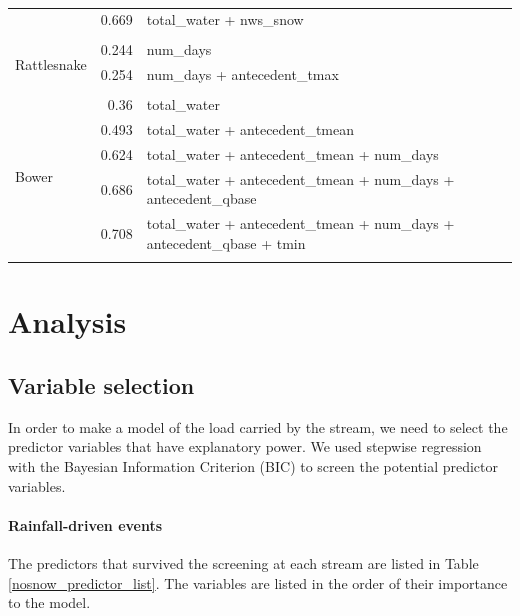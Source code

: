 \documentclass[10pt]{article}
\begin{document}
\begin{table}[h]
\begin{center}
\begin{tabular}{lrl}
 & 0.669 & total\_water + nws\_snow\\ 
\vspace{2mm}\\ \multirow{3}{*}{Rattlesnake} & 0.244 & num\_days\\ 
 & 0.254 & num\_days + antecedent\_tmax\\ 
\vspace{2mm}\\ \multirow{6}{*}{Bower} & 0.36 & total\_water\\ 
 & 0.493 & total\_water + antecedent\_tmean\\ 
 & 0.624 & total\_water + antecedent\_tmean + num\_days\\ 
 & 0.686 & total\_water + antecedent\_tmean + num\_days + antecedent\_qbase\\ 
 & 0.708 & total\_water + antecedent\_tmean + num\_days + antecedent\_qbase + tmin\\ 
\vspace{2mm}\\     \end{tabular}
    \caption{\label{phos_r_square_nosnow}}
    \end{center}
\end{table}


\section{Analysis}

\subsection{Variable selection}
In order to make a model of the load carried by the stream, we need to select the predictor variables that have explanatory power. We used stepwise regression with the Bayesian Information Criterion (BIC) to screen the potential predictor variables.

\paragraph{Rainfall-driven events} The predictors that survived the screening at each stream are listed in Table \ref{nosnow_predictor_list}. The variables are listed in the order of their importance to the model.\\
\end{document}
